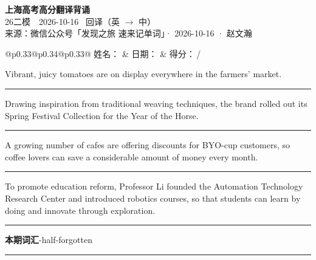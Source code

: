 \documentclass[11pt,a4paper]{article}
\newcommand{\num}[1]{\makebox[1.9em][r]{#1.}\hspace{0.3em}}
\newcommand{\wline}{\noindent\rule{\linewidth}{0.4pt}}
\begin{document}
\pagestyle{plain}
\begin{center}
{\LARGE\bfseries 上海高考高分翻译背诵 }\\[0.25em]
{\large 26二模　2026-10-16 \quad\ 回译（英 $\to$ 中）}\\[0.35em]
{\footnotesize 来源：微信公众号「发现之旅 速来记单词」· 2026-10-16 · 赵文瀚}
\end{center}

\vspace{0.4em}
\noindent\begin{tabular}{@{}p{0.33\textwidth}@{}p{0.34\textwidth}@{}p{0.33\textwidth}@{}}
姓名：\underline{\hspace{2.0cm}} & 日期：\underline{\hspace{2.0cm}} & 得分：\underline{\hspace{1.4cm}}\,/ \\
\end{tabular}

\vspace{0.5em}

\vspace{0.8em}
\num{1}Vibrant, juicy tomatoes are on display everywhere in the farmers’ market.

\vspace{0.25em}

\wline

\num{2}Drawing inspiration from traditional weaving techniques, the brand rolled out its Spring Festival Collection for the Year of the Horse.

\vspace{0.25em}

\wline

\num{3}A growing number of cafes are offering discounts for BYO-cup customers, so coffee lovers can save a considerable amount of money every month.

\vspace{0.25em}

\wline

\num{4}To promote education reform, Professor Li founded the Automation Technology Research Center and introduced robotics courses, so that students can learn by doing and innovate through exploration.

\vspace{0.25em}

\wline

\vspace{0.4em}\noindent{\color{rulegray}\rule{\textwidth}{0.6pt}}\vspace{0.4em}

\num{5}\textbf{本期词汇}\quad -half-forgotten

\vspace{0.25em}

\wline
\end{document}
